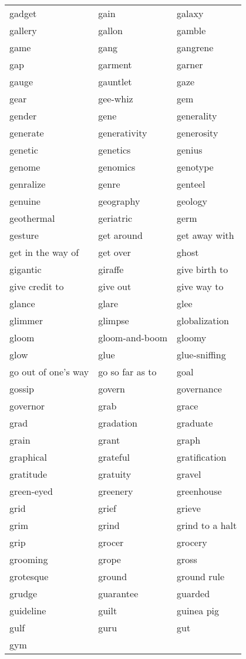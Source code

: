 \documentclass{minimal}
\begin{document}
\begin{longtable}{p{2.7cm}@{\hskip 0.2cm}p{2.7cm}@{\hskip 0.2cm}p{2.7cm}}
gadget & gain & galaxy \\
gallery & gallon & gamble \\
game & gang & gangrene \\
gap & garment & garner \\
gauge & gauntlet & gaze \\
gear & gee-whiz & gem \\
gender & gene & generality \\
generate & generativity & generosity \\
genetic & genetics & genius \\
genome & genomics & genotype \\
genralize & genre & genteel \\
genuine & geography & geology \\
geothermal & geriatric & germ \\
gesture & get around & get away with \\
get in the way of & get over & ghost \\
gigantic & giraffe & give birth to \\
give credit to & give out & give way to \\
glance & glare & glee \\
glimmer & glimpse & globalization \\
gloom & gloom-and-boom & gloomy \\
glow & glue & glue-sniffing \\
go out of one's way & go so far as to & goal \\
gossip & govern & governance \\
governor & grab & grace \\
grad & gradation & graduate \\
grain & grant & graph \\
graphical & grateful & gratification \\
gratitude & gratuity & gravel \\
green-eyed & greenery & greenhouse \\
grid & grief & grieve \\
grim & grind & grind to a halt \\
grip & grocer & grocery \\
grooming & grope & gross \\
grotesque & ground & ground rule \\
grudge & guarantee & guarded \\
guideline & guilt & guinea pig \\
gulf & guru & gut \\
gym
\end{longtable}
\end{document}
